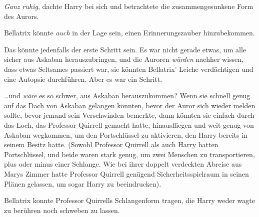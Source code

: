 \emph{Ganz ruhig}, dachte Harry bei sich und betrachtete die zusammengesunkene Form des Aurors.

Bellatrix könnte \emph{auch} in der Lage sein, einen Erinnerungszauber hinzubekommen.

Das könnte jedenfalls der erste Schritt sein. Es war nicht gerade etwas, um alle sicher aus Askaban herauszubringen, und die Auroren \emph{würden} nachher wissen, dass etwas Seltsames passiert war, sie könnten Bellatrix' Leiche verdächtigen und eine Autopsie durchführen. Aber es war ein Schritt.

…und \emph{wäre} es so schwer, aus Askaban herauszukommen? Wenn sie schnell genug auf das Dach von Askaban gelangen könnten, bevor der Auror sich wieder melden sollte, bevor jemand sein Verschwinden bemerkte, dann könnten sie einfach durch das Loch, das Professor Quirrell gemacht hatte, hinausfliegen und weit genug von Askaban wegkommen, um den Portschlüssel zu aktivieren, den Harry bereits in seinem Besitz hatte. (Sowohl Professor Quirrell als auch Harry hatten Portschlüssel, und beide waren stark genug, um zwei Menschen zu transportieren, plus oder minus einer Schlange. Wie bei ihrer doppelt verdeckten Abreise aus Marys Zimmer hatte Professor Quirrell genügend Sicherheitsspielraum in seinen Plänen gelassen, um sogar Harry zu beeindrucken).

Bellatrix konnte Professor Quirrells Schlangenform tragen, die Harry weder wagte zu berühren noch schweben zu lassen.

